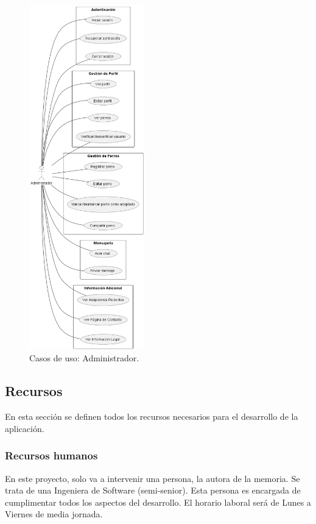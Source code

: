 \documentclass[a4paper, 12pt]{article}
\begin{document}
\begin{figure}[H]
	\begin{center}
		{\includegraphics[width=5cm]{diagram/Admin.png}\par}
		\caption{Casos de uso: Administrador.}
	\end{center}
\end{figure}





\newpage
\subsection{Recursos}

En esta sección se definen todos los recursos necesarios para el desarrollo de la aplicación.

\subsubsection{Recursos humanos}

En este proyecto, solo va a intervenir una persona, la autora de la memoria. Se trata de una Ingeniera de Software (semi-senior). Esta persona es encargada de cumplimentar todos los aspectos del desarrollo. El horario laboral será de Lunes a Viernes de media jornada.
\end{document}
